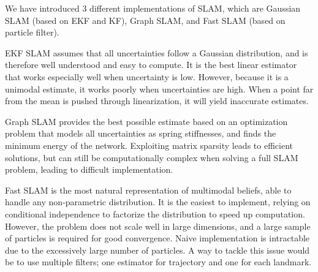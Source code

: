 \documentclass[twoside]{article}
\begin{document}
We have introduced 3 different implementations of SLAM, which are Gaussian SLAM (based on EKF and KF), Graph SLAM, and Fast SLAM (based on particle filter). 

EKF SLAM assumes that all uncertainties follow a Gaussian distribution, and is therefore well understood and easy to compute. It is the best linear estimator that works especially well when uncertainty is low. However, because it is a unimodal estimate, it works poorly when uncertainties are high. When a point far from the mean is pushed through linearization, it will yield inaccurate estimates.

Graph SLAM provides the best possible estimate based on an optimization problem that models all uncertainties as spring stiffnesses, and finds the minimum energy of the network. Exploiting matrix sparsity leads to efficient solutions, but can still be computationally complex when solving a full SLAM problem, leading to difficult implementation.

Fast SLAM is the most natural representation of multimodal beliefs, able to handle any non-parametric distribution. It is the easiest to implement, relying on conditional independence to factorize the distribution to speed up computation. However, the problem does not scale well in large dimensions, and a large sample of particles is required for good convergence. Naive implementation is intractable due to the excessively large number of particles. A way to tackle this issue would be to use multiple filters; one estimator for trajectory and one for each landmark.
\end{document}
